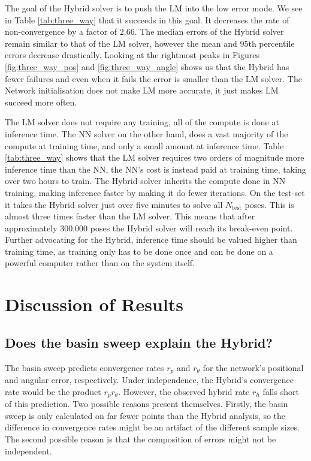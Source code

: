 The goal of the Hybrid solver is to push the LM into the low error mode. We see in Table \ref{tab:three_way} that it succeeds in this goal. It decreases the rate of non-convergence by a factor of $2.66$. The median errors of the Hybrid solver remain similar to that of the LM solver, however the mean and 95th percentile errors decrease drastically. Looking at the rightmost peaks in Figures \ref{fig:three_way_pos} and \ref{fig:three_way_angle} shows us that the Hybrid has fewer failures and even when it fails the error is smaller than the LM solver. The Network initialisation does not make LM more accurate, it just makes LM succeed more often.

The LM solver does not require any training, all of the compute is done at inference time. The NN solver on the other hand, does a vast majority of the compute at training time, and only a small amount at inference time. Table \ref{tab:three_way} shows that the LM solver requires two orders of magnitude more inference time than the NN, the NN's cost is instead paid at training time, taking over two hours to train. The Hybrid solver inherits the compute done in NN training, making inference faster by making it do fewer iterations. On the test-set it takes the Hybrid solver just over five minutes to solve all $N_{\mathrm{test}}$ poses. This is almost three times faster than the LM solver. This means that after approximately 300,000 poses the Hybrid solver will reach its break-even point. Further advocating for the Hybrid, inference time should be valued higher than training time, as training only has to be done once and can be done on a powerful computer rather than on the system itself. 


\section{Discussion of Results}
\subsection{Does the basin sweep explain the Hybrid?} The basin sweep predicts convergence rates $r_p$ and $r_\theta$ for the network's positional and angular error, respectively. Under independence, the Hybrid's convergence rate would be the product $r_p r_\theta$. However, the observed hybrid rate $r_h$ falls short of this prediction. Two possible reasons present themselves. Firstly, the basin sweep is only calculated on far fewer points than the Hybrid analysis, so the difference in convergence rates might be an artifact of the different sample sizes. The second possible reason is that the composition of errors might not be independent. 

